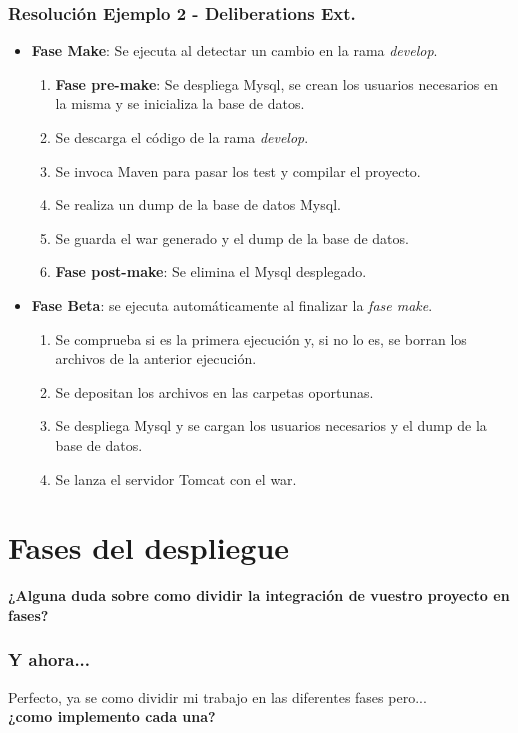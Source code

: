 \documentclass[
xcolor={svgnames},
hyperref={colorlinks,citecolor=DeepPink4,linkcolor=Black,urlcolor=DarkBlue}
]{beamer}
\begin{document}
\begin{frame}
	\frametitle{Resolución Ejemplo 2 - Deliberations Ext.}
	\begin{itemize}
		\item \textbf{Fase Make}: Se ejecuta al detectar un cambio en la rama \textit{develop}.
		\begin{enumerate}
			\item \textbf{Fase pre-make}: Se despliega Mysql, se crean los usuarios necesarios en la misma y se inicializa la base de datos.
			\item Se descarga el código de la rama \textit{develop}.
			\item Se invoca Maven para pasar los test y compilar el proyecto.
			\item Se realiza un dump de la base de datos Mysql.
			\item Se guarda el war generado y el dump de la base de datos.
			\item \textbf{Fase post-make}: Se elimina el Mysql desplegado.
		\end{enumerate}
		\item \textbf{Fase Beta}: se ejecuta automáticamente al finalizar la \textit{fase make}.
		\begin{enumerate}
			\item Se comprueba si es la primera ejecución y, si no lo es, se borran los archivos de la anterior ejecución.
			\item Se depositan los archivos en las carpetas oportunas.
			\item Se despliega Mysql y se cargan los usuarios necesarios y el dump de la base de datos.
			\item Se lanza el servidor Tomcat con el war.
		\end{enumerate}
	\end{itemize}
\end{frame}

\section*{Fases del despliegue}

\begin{frame}
	\begin{center}
		\textbf{¿Alguna duda sobre como dividir la integración de vuestro proyecto en fases?}
	\end{center}
\end{frame}

\begin{frame}
	\frametitle{Y ahora... }
	\begin{center}
	Perfecto, ya se como dividir mi trabajo en las diferentes fases pero... \\

		\textbf{¿como implemento cada una?}
	\end{center}
\end{frame}
\end{document}
